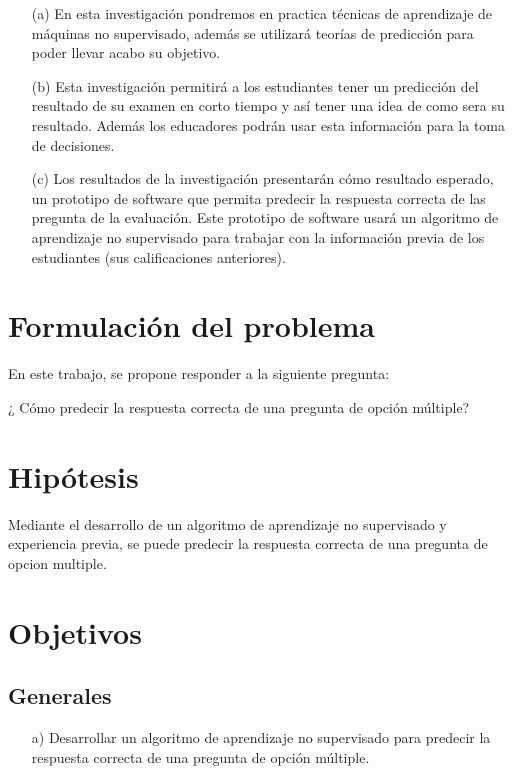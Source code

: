 \begin{enumerate}
\item[(a)] En esta investigación pondremos en practica técnicas de aprendizaje de máquinas no supervisado, además se utilizará teorías de predicción para poder llevar acabo su objetivo. 

\item[(b)]Esta investigación permitirá a los estudiantes tener un predicción del resultado de su examen en corto tiempo y así tener una idea de como sera su resultado. Además los educadores podrán usar esta información para la toma de decisiones.

\item[(c)]Los resultados de la investigación presentarán cómo resultado esperado, un prototipo de software que permita predecir la respuesta correcta de las pregunta de la evaluación. Este prototipo de software usará un algoritmo de aprendizaje no supervisado para trabajar con la información previa de los estudiantes (sus calificaciones anteriores).
\end{enumerate}


\section{Formulación del problema}

  En este trabajo, se propone responder a la siguiente pregunta:
 \begin{center} 
     ¿ Cómo predecir la respuesta correcta de una pregunta de opción múltiple?
 \end{center}


\section{Hipótesis}
Mediante el desarrollo de un algoritmo de aprendizaje no supervisado y experiencia previa, se puede predecir la respuesta correcta de una pregunta de opcion multiple. \par  
\vskip 0.3cm

\section{Objetivos}

\subsection{Generales}
\begin{enumerate}
\item[a)] Desarrollar un algoritmo de aprendizaje no supervisado para predecir la respuesta correcta de una pregunta de opción múltiple.
\end{enumerate}

